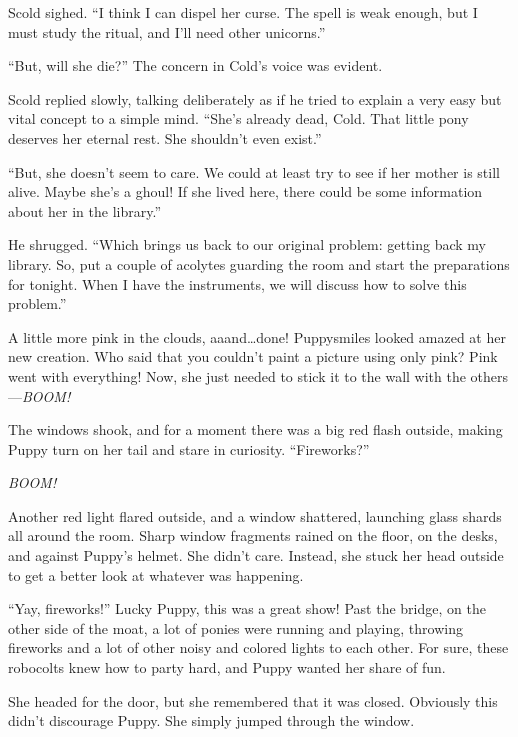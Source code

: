 Scold sighed. ``I think I can dispel her curse. The spell is weak enough, but I must study the ritual, and I'll need other unicorns.''

``But, will she die?'' The concern in Cold's voice was evident.

Scold replied slowly, talking deliberately as if he tried to explain a very easy but vital concept to a simple mind. ``She's already dead, Cold. That little pony deserves her eternal rest. She shouldn't even exist.''

``But, she doesn't seem to care. We could at least try to see if her mother is still alive. Maybe she's a ghoul! If she lived here, there could be some information about her in the library.''

He shrugged. ``Which brings us back to our original problem: getting back my library. So, put a couple of acolytes guarding the room and start the preparations for tonight. When I have the instruments, we will discuss how to solve this problem.''



\horizonline


A little more pink in the clouds, aaand\dots done! Puppysmiles looked amazed at her new creation. Who said that you couldn't paint a picture using only pink? Pink went with everything! Now, she just needed to stick it to the wall with the others---\emph{BOOM!}

The windows shook, and for a moment there was a big red flash outside, making Puppy turn on her tail and stare in curiosity. ``Fireworks?''

\emph{BOOM!}

Another red light flared outside, and a window shattered, launching glass shards all around the room. Sharp window fragments rained on the floor, on the desks, and against Puppy's helmet. She didn't care. Instead, she stuck her head outside to get a better look at whatever was happening.

``Yay, fireworks!'' Lucky Puppy, this was a great show! Past the bridge, on the other side of the moat, a lot of ponies were running and playing, throwing fireworks and a lot of other noisy and colored lights to each other. For sure, these robocolts knew how to party hard, and Puppy wanted her share of fun.

She headed for the door, but she remembered that it was closed. Obviously this didn't discourage Puppy. She simply jumped through the window.

